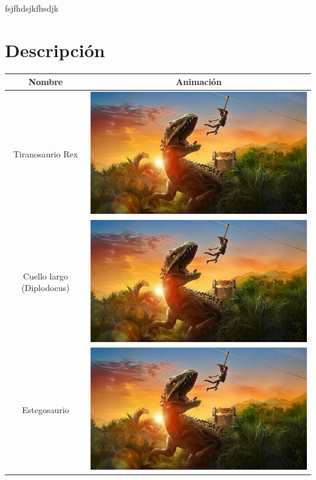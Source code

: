 \documentclass[12pt]{article} %
\begin{document}
 	fsjfhdsjkfhsdjk
	
	\newpage
	\section{Descripción}
	\begin{table}[h]
		\begin{center}
			\begin{tabular}{| c | c |}
				\hline
				\textbf{Nombre} & \textbf{Animación} \\ \hline
				Tiranosaurio Rex & \includegraphics[scale=0.3]{intro.png}  \\ \hline
				Cuello largo (Diplodocus) & \includegraphics[scale=0.3]{intro.png} \\ \hline
				Estegosaurio & \includegraphics[scale=0.3]{intro.png}  \\ \hline

\end{tabular}
\end{center}
\end{table}
\end{document}
